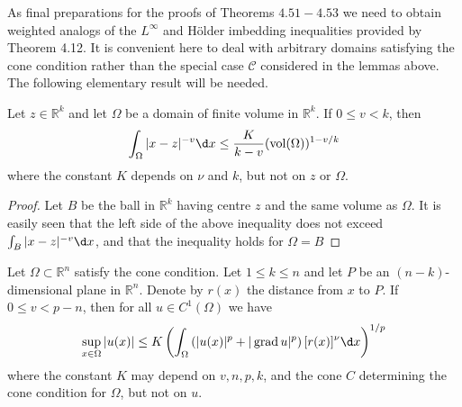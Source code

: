 As final preparations for the proofs of Theorems $4.51-4.53$ we need to obtain weighted analogs of the $L^{\infty}$ and Hölder imbedding inequalities provided by Theorem 4.12. It is convenient here to deal with arbitrary domains satisfying the cone condition rather than the special case $\mathcal{C}$ considered in the lemmas above. The following elementary result will be needed.


\begin{lemma}
  Let $z \in \mathbb{R}^k$ and let $\Omega$ be a domain of finite volume in $\mathbb{R}^k$. If $0 \leq v<k$, then
  \[
  \int_{\Omega}|x-z|^{-v} \d x \leq \frac{K}{k-v}(\vol(\Omega))^{1-v / k}
  \]
  where the constant $K$ depends on $\nu$ and $k$, but not on $z$ or $\Omega$.
\end{lemma}

\begin{proof}
  Let $B$ be the ball in $\mathbb{R}^k$ having centre $z$ and the same volume as $\Omega$. It is easily seen that the left side of the above inequality does not exceed $\int_B|x-z|^{-v} \d x$, and that the inequality holds for $\Omega=B$
\end{proof}


\begin{lemma}
  Let $\Omega \subset \mathbb{R}^n$ satisfy the cone condition. Let $1 \leq k \leq n$ and let $P$ be an $(n-k)$-dimensional plane in $\mathbb{R}^n$. Denote by $r(x)$ the distance from $x$ to $P$. If $0 \leq v<p-n$, then for all $u \in C^1(\Omega)$ we have
  \[
  \sup _{x \in \Omega}|u(x)| \leq K\left(\int_{\Omega}\left(|u(x)|^p+|\grad u|^p\right)[r(x)]^\nu \d x\right)^{1 / p}
  \]
  where the constant $K$ may depend on $v, n, p, k$, and the cone $C$ determining the cone condition for $\Omega$, but not on $u$.
\end{lemma}

